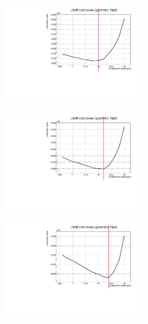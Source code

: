 \documentclass[a4paper, 11pt]{report}
\begin{document}
\begin{figure}[htbp]
\begin{minipage}[b]{.32\textwidth}
\includegraphics[width=6cm, height=4.6cm]{figs/likelihood100HighStat/likelihood18p0.pdf}
\end{minipage}\hfill
\begin{minipage}[b]{.32\textwidth}
\includegraphics[width=6cm, height=4.6cm]{figs/likelihood100HighStat/likelihood18p2.pdf}
\end{minipage} \hfill
\begin{minipage}[b]{.32\textwidth}
\includegraphics[width=6cm, height=4.6cm]{figs/likelihood100HighStat/likelihood18p4.pdf}
\end{minipage} \hfill \vspace{10pt}


\end{figure}
\end{document}
